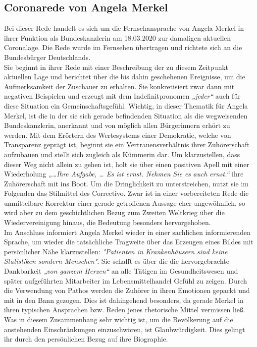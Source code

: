 \subsection{Coronarede von Angela Merkel} 
\label{sec: Coronarede von Angela Merkel}
Bei dieser Rede handelt es sich um die Fernsehansprache von Angela Merkel in ihrer Funktion als Bundeskanzlerin am 18.03.2020 zur damaligen aktuellen Coronalage. Die Rede wurde im Fernsehen übertragen und richtete sich an die Bundesbürger Deutschlands.
\\Sie beginnt in ihrer Rede mit einer Beschreibung der zu diesem Zeitpunkt aktuellen Lage und berichtet über die bis dahin geschehenen Ereignisse, um die Aufmerksamkeit der Zuschauer zu erhalten. Sie konkretisiert zwar dann mit negativen Beispielen und erzeugt mit dem Indefinitpronomen \textit{„jeder“} auch für diese Situation ein Gemeinschaftsgefühl.
Wichtig, in dieser Thematik für Angela Merkel, ist die in der sie sich gerade befindenden Situation als die wegweisenden Bundeskanzlerin, anerkannt und von möglich allen Bürgerinnern erhört zu werden.
Mit dem Erörtern des Wertesystems einer Demokratie, welche von Transparenz geprägt ist, beginnt sie ein Vertrauensverhältnis ihrer Zuhörerschaft aufzubauen und stellt sich zugleich als Kümmerin dar. Um klarzustellen, dass dieser Weg nicht allein zu gehen ist, holt sie über einen positiven Apell mit einer Wiederholung \textit{„…Ihre Aufgabe, … Es ist ernst. Nehmen Sie es auch ernst.“} ihre Zuhörerschaft mit ins Boot. Um die Dringlichkeit zu unterstreichen, nutzt sie im Folgenden das Stilmittel des Correctivo. Zwar ist in einer vorbereiteten Rede die unmittelbare Korrektur einer gerade getroffenen Aussage eher ungewöhnlich, so wird aber zu dem geschichtlichen Bezug zum Zweiten Weltkrieg über die Wiedervereinigung hinaus, die Bedeutung besonders hervorgehoben.
\\Im Anschluss informiert Angela Merkel wieder in einer sachlichen informierenden Sprache, um wieder die tatsächliche Tragweite über das Erzeugen eines Bildes mit persönlicher Nähe klarzustellen: \textit{"Patienten in Krankenhäusern sind keine Statistiken sondern Menschen"}. Sie schafft es über die die hervorgebrachte Dankbarkeit \textit{„von ganzem Herzen“} an alle Tätigen im Gesundheitswesen und später aufgeführten Mitarbeiter im Lebensmittelhandel Gefühl zu zeigen. Durch die Verwendung von Pathos werden die Zuhörer in ihren Emotionen gepackt und mit in den Bann gezogen. Dies ist dahingehend besonders, da gerade Merkel in ihren typischen Ansprachen bzw. Reden jenes rhetorische Mittel vermissen ließ. Was in diesem Zusammenhang sehr wichtig ist, um die Bevölkerung auf die anstehenden Einschränkungen einzuschwören, ist Glaubwürdigkeit. Dies gelingt ihr durch den persönlichen Bezug auf ihre Biographie. 
